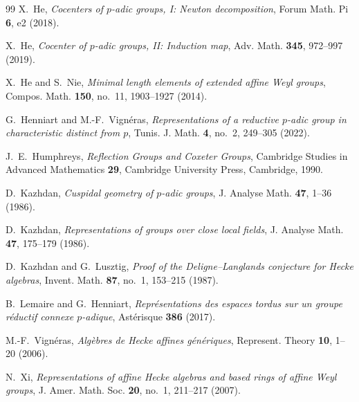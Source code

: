 \documentclass[11pt,letterpaper]{amsart}
\theoremstyle{definition}
\numberwithin{equation}{section}
\numberwithin{theorem}{section}
\begin{document}
\begin{thebibliography}{99}
 X.~He,
\emph{Cocenters of $p$-adic groups, I: Newton decomposition},
Forum Math. Pi \textbf{6}, e2 (2018).

 X.~He,
\emph{Cocenter of $p$-adic groups, II: Induction map},
Adv. Math. \textbf{345}, 972--997 (2019).

 X.~He and S.~Nie,
\emph{Minimal length elements of extended affine Weyl groups},
Compos. Math. \textbf{150}, no.~11, 1903--1927 (2014).

 G.~Henniart and M.-F.~Vign\'eras,
\emph{Representations of a reductive $p$-adic group in characteristic distinct from $p$},
Tunis. J. Math. \textbf{4}, no.~2, 249--305 (2022).

 J.~E.~Humphreys,
\emph{Reflection Groups and Coxeter Groups},
Cambridge Studies in Advanced Mathematics \textbf{29}, Cambridge University Press, Cambridge, 1990.

 D.~Kazhdan,
\emph{Cuspidal geometry of $p$-adic groups},
J. Analyse Math. \textbf{47}, 1--36 (1986).

 D.~Kazhdan,
\emph{Representations of groups over close local fields},
J. Analyse Math. \textbf{47}, 175--179 (1986).

 D.~Kazhdan and G.~Lusztig,
\emph{Proof of the Deligne--Langlands conjecture for Hecke algebras},
Invent. Math. \textbf{87}, no.~1, 153--215 (1987).

 B.~Lemaire and G.~Henniart,
\emph{Repr\'esentations des espaces tordus sur un groupe r\'eductif connexe $p$-adique},
Ast\'erisque \textbf{386} (2017).

 M.-F.~Vign\'eras,
\emph{Alg\`ebres de Hecke affines g\'en\'eriques},
Represent. Theory \textbf{10}, 1--20 (2006).

 N.~Xi,
\emph{Representations of affine Hecke algebras and based rings
of affine Weyl groups},
J. Amer. Math. Soc. \textbf{20}, no.~1, 211--217 (2007).

\end{thebibliography}
\end{document}
